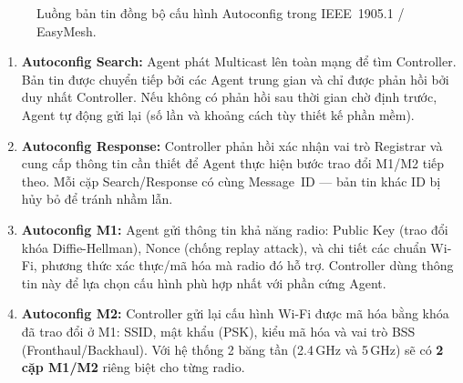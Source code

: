 \begin{figure}[ht]
	\caption{Luồng bản tin đồng bộ cấu hình Autoconfig trong IEEE~1905.1 / EasyMesh.}
	\label{fig:autoconfig-flow}
\end{figure}

\begin{enumerate}
	\item \textbf{Autoconfig Search:} Agent phát Multicast lên toàn mạng để tìm
	Controller. Bản tin được chuyển tiếp bởi các Agent trung gian và chỉ được
	phản hồi bởi duy nhất Controller. Nếu không có phản hồi sau thời gian chờ
	định trước, Agent tự động gửi lại (số lần và khoảng cách tùy thiết kế phần
	mềm).
	
	\item \textbf{Autoconfig Response:} Controller phản hồi xác nhận vai trò Registrar
	và cung cấp thông tin cần thiết để Agent thực hiện bước trao đổi M1/M2 tiếp
	theo. Mỗi cặp Search/Response có cùng Message~ID --- bản tin khác ID bị hủy
	bỏ để tránh nhầm lẫn.
	
	\item \textbf{Autoconfig M1:} Agent gửi thông tin khả năng radio: Public Key (trao
	đổi khóa Diffie-Hellman), Nonce (chống replay attack), và chi tiết các chuẩn
	Wi-Fi, phương thức xác thực/mã hóa mà radio đó hỗ trợ. Controller dùng thông
	tin này để lựa chọn cấu hình phù hợp nhất với phần cứng Agent.
	
	\item \textbf{Autoconfig M2:} Controller gửi lại cấu hình Wi-Fi được mã hóa bằng
	khóa đã trao đổi ở M1: SSID, mật khẩu (PSK), kiểu mã hóa và vai trò BSS
	(Fronthaul/Backhaul). Với hệ thống 2 băng tần (2.4\,GHz và 5\,GHz) sẽ có
	\textbf{2 cặp M1/M2} riêng biệt cho từng radio.
\end{enumerate}


